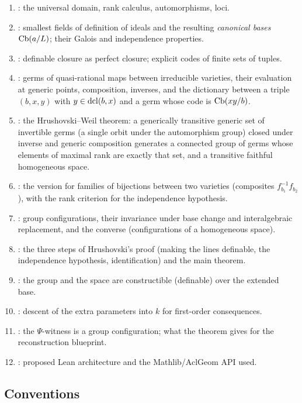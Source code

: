 \begin{enumerate}
\item {}: the universal domain, rank calculus, automorphisms, loci.
\item {}: smallest fields of definition of ideals and the resulting
  \emph{canonical bases} $\operatorname{Cb}(a/L)$; their Galois and independence properties.
\item {}: definable closure as perfect closure; explicit codes of
  finite sets of tuples.
\item {}: germs of quasi-rational maps between irreducible varieties,
  their evaluation at generic points, composition, inverses, and the dictionary
  between a triple $(b,x,y)$ with $y\in\operatorname{dcl}(b,x)$ and a germ whose code is
  $\operatorname{Cb}(xy/b)$.
\item {}: the Hrushovski--Weil theorem: a generically transitive generic
  set of invertible germs (a single orbit under the automorphism group) closed under
  inverse and generic composition generates a connected group of germs whose elements
  of maximal rank are exactly that set, and a transitive faithful homogeneous space.
\item {}: the version for families of bijections between two varieties
  (composites $f_{b_1}^{-1}f_{b_2}$), with the rank criterion for the independence
  hypothesis.
\item {}: group configurations, their invariance under base change and
  interalgebraic replacement, and the converse (configurations of a homogeneous space).
\item {}: the three steps of Hrushovski's proof (making the lines
  definable, the independence hypothesis, identification) and the main theorem.
\item {}: the group and the space are constructible
  (definable) over the extended base.
\item {}: descent of the extra parameters into $k$ for first-order
  consequences.
\item {}: the $\Psi$-witness is a group configuration; what the
  theorem gives for the reconstruction blueprint.
\item {}: proposed Lean architecture and the Mathlib/AclGeom API used.
\end{enumerate}

\subsection{Conventions}

